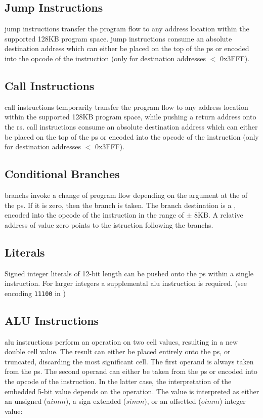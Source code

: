 \subsection{Jump Instructions}
\label{opcodes:jump}

\Gls{jump} instructions transfer the program flow to any address
location within the supported 128KB program space. \Gls{jump} instructions consume an absolute
destination address which can either be placed on the top of the \gls{ps} or encoded
into the opcode of the instruction (only for destination addresses $<$ 0x3FFF).

\subsection{Call Instructions}
\label{opcodes:call}

\Gls{call} instructions temporarily transfer the program flow to any address
location within the supported 128KB program space, while pushing a return address onto
the \gls{rs}. \Gls{call} instructions consume an absolute
destination address which can either be placed on the top of the \Gls{ps} or encoded
into the opcode of the instruction (only for destination addresses $<$ 0x3FFF).

\subsection{Conditional Branches}
\label{opcodes:branch}

\Glspl{branch} invoke a change of program flow depending on the argument at the 
of the \gls{ps}.
If it is zero, then the branch is taken.
The branch destination is a , encoded into the opcode
of the instruction in the range of $\pm$ 8KB.
A relative address of value zero points to the istruction following the \glspl{branch}.

\subsection{Literals}
\label{opcodes:literal}

Signed integer \glspl{literal} of 12-bit length can be pushed onto the \gls{ps} within
a single instruction. For larger integers a supplemental \gls{alu} instruction is required.
(see encoding \texttt{11100} in )

\subsection{ALU Instructions}
\label{opcodes:alu}
\Gls{alu} instructions perform an operation on two \gls{cell} values, resulting in a new double 
\gls{cell} value. The result can either be placed entirely onto the \gls{ps}, or truncated, discarding
the most significant \gls{cell}. The first operand is always taken from the \gls{ps}. The second operand can
either be taken from the \gls{ps} or encoded into the opcode of the instruction. In the latter case,
the interpretation of the embedded 5-bit value depends on the operation. The  value is
interpreted as either an unsigned ($uimm$), a sign extended ($simm$), or an offsetted ($oimm$) integer value:

